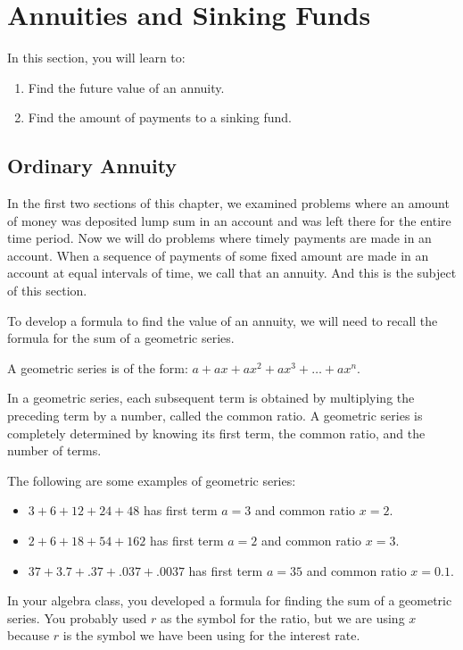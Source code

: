 \section{Annuities and Sinking Funds} \label{section_annuities}

In this section, you will learn to:
\begin{enumerate}
    \item Find the future value of an annuity.
    \item Find the amount of payments to a sinking fund.
\end{enumerate}

\subsection{Ordinary Annuity}

In the first two sections of this chapter, we examined problems where an amount of money was deposited lump sum in an account and was left there for the entire time period. Now we will do problems where timely payments are made in an account. When a sequence of payments of some fixed amount are made in an account at equal intervals of time, we call that an annuity. And this is the subject of this section.

To develop a formula to find the value of an annuity, we will need to recall the formula for the sum of a geometric series.

A geometric series is of the form: $a + ax + ax^2 + ax^3 + \ldots + ax^n$.

In a geometric series, each subsequent term is obtained by multiplying the preceding term by a number, called the common ratio. A geometric series is completely determined by knowing its first term, the common ratio, and the number of terms.

The following are some examples of geometric series:
\begin{itemize}
    \item $3 + 6 + 12 + 24 + 48$ has first term $a = 3$ and common ratio $x = 2$.
    \item $2 + 6 + 18 + 54 + 162$ has first term $a = 2$ and common ratio $x = 3$.
    \item $37 + 3.7 + .37 + .037 + .0037$ has first term $a = 35$ and common ratio $x = 0.1$.
\end{itemize}

In your algebra class, you developed a formula for finding the sum of a geometric series. You probably used $r$ as the symbol for the ratio, but we are using $x$ because $r$ is the symbol we have been using for the interest rate.

